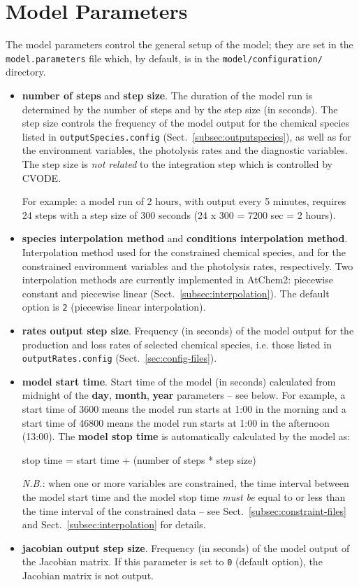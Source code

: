 \section{Model Parameters} \label{sec:model-parameters}

The model parameters control the general setup of the model; they are
set in the \texttt{model.parameters} file which, by default, is
in the \texttt{model/configuration/} directory.

\begin{itemize}
\item \textbf{number of steps} and \textbf{step size}. The duration of
  the model run is determined by the number of steps and by the step
  size (in seconds). The step size controls the frequency of the model
  output for the chemical species listed in \texttt{outputSpecies.config}
  (Sect.~\ref{subsec:outputspecies}), as well as for the environment
  variables, the photolysis rates and the diagnostic variables. The
  step size is \emph{not related} to the integration step which is
  controlled by CVODE.

  For example: a model run of 2 hours, with output every 5 minutes,
  requires 24 steps with a step size of 300 seconds (24 x 300 = 7200
  sec = 2 hours).
\item \textbf{species interpolation method} and
  \textbf{conditions interpolation method}. Interpolation method used
  for the constrained chemical species, and for the constrained
  environment variables and the photolysis rates, respectively. Two
  interpolation methods are currently implemented in AtChem2:
  piecewise constant and piecewise linear (Sect.~\ref{subsec:interpolation}).
  The default option is \texttt{2} (piecewise linear interpolation).
\item \textbf{rates output step size}. Frequency (in seconds) of the
  model output for the production and loss rates of selected chemical
  species, i.e. those listed in \texttt{outputRates.config}
  (Sect.~\ref{sec:config-files}).
\item \textbf{model start time}. Start time of the model (in seconds)
  calculated from midnight of the \textbf{day}, \textbf{month},
  \textbf{year} parameters -- see below. For example, a start time of
  3600 means the model run starts at 1:00 in the morning and a start
  time of 46800 means the model run starts at 1:00 in the afternoon
  (13:00). The \textbf{model stop time} is automatically calculated by
  the model as:
  \begin{center}
  stop time = start time + (number of steps * step size)
  \end{center}
  \emph{N.B.}: when one or more variables are constrained, the time
  interval between the model start time and the model stop time
  \emph{must be} equal to or less than the time interval of the
  constrained data -- see Sect.~\ref{subsec:constraint-files} and
  Sect.~\ref{subsec:interpolation} for details.
\item \textbf{jacobian output step size}. Frequency (in seconds) of
  the model output of the Jacobian matrix. If this parameter is set to
  \texttt{0} (default option), the Jacobian matrix is not output.


\end{itemize}
